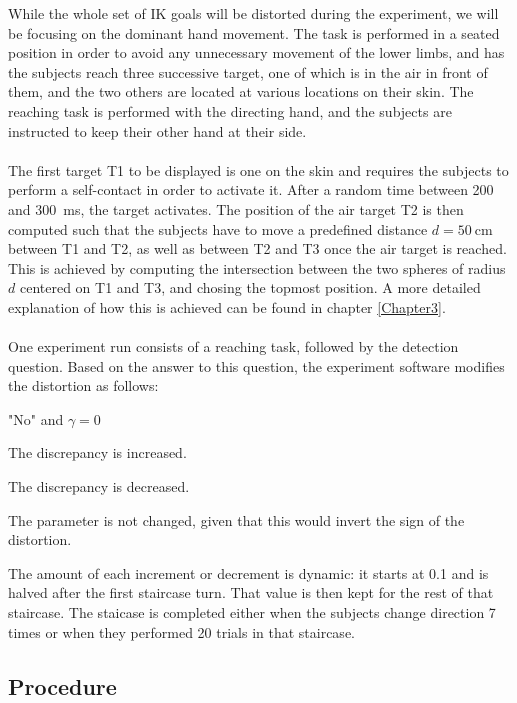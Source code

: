 While the whole set of IK goals will be distorted during the experiment, we will be focusing on the dominant hand movement. The task is performed in a seated position in order to avoid any unnecessary movement of the lower limbs, and has the subjects reach three successive target, one of which is in the air in front of them, and the two others are located at various locations on their skin. The reaching task is performed with the directing hand, and the subjects are instructed to keep their other hand at their side.
\\\\
The first target T1 to be displayed is one on the skin and requires the subjects to perform a self-contact in order to activate it. After a random time between \num{200} and \SI{300}{\milli\second}, the target activates. The position of the air target T2 is then computed such that the subjects have to move a predefined distance $d = \SI{50}{\centi\meter}$ between T1 and T2, as well as between T2 and T3 once the air target is reached. This is achieved by computing the intersection between the two spheres of radius $d$ centered on T1 and T3, and chosing the topmost position. A more detailed explanation of how this is achieved can be found in chapter \ref{Chapter3}.
\\\\
One experiment run consists of a reaching task, followed by the detection question. Based on the answer to this question, the experiment software modifies the distortion as follows:

\begin{labeling}{"No" and $\gamma = 0$}
  \item ["Yes"] The discrepancy is increased.
  \item ["No" and $\gamma \neq 0$] The discrepancy is decreased.
  \item ["No" and $\gamma = 0$] The parameter is not changed, given that this would invert the sign of the distortion.
\end{labeling}
\noindent
The amount of each increment or decrement is dynamic: it starts at \num{0.1} and is halved after the first staircase turn. That value is then kept for the rest of that staircase. The staicase is completed either when the subjects change direction 7 times or when they performed 20 trials in that staircase.

\subsection{Procedure}

